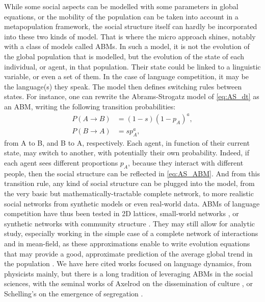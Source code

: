 \documentclass[../thesis.tex]{subfiles}
\begin{document}
While some social aspects can be modelled with some parameters in global equations, or
the mobility of the population can be taken into account in a metapopulation framework,
the social structure itself can hardly be incorporated into these two kinds of model.
That is where the micro approach shines, notably with a class of models called
\acp{ABM}. In such a model, it is not the evolution of the global population that is
modelled, but the evolution of the state of each individual, or agent, in that
population. Their state could be linked to a linguistic variable, or even a set of them.
In the case of language competition, it may be the language(s) they speak. The model
then defines switching rules between states. For instance, one can rewrite the
Abrams-Strogatz model of \cref{eq:AS_dt} as an \ac{ABM}, writing the following
transition probabilities:
\begin{equation}
  \label{eq:AS_ABM}
  \begin{aligned}
    P(A \rightarrow B) &= (1 - s) (1 - p_A)^a, \\
    P(B \rightarrow A) &= s p_A^a,
  \end{aligned}
\end{equation}
from A to B, and B to A, respectively. Each agent, in function of their current state,
may switch to another, with potentially their own probability. Indeed, if each agent
sees different proportions $p_A$, because they interact with different people, then the
social structure can be reflected in \cref{eq:AS_ABM}. And from this transition rule,
any kind of social structure can be plugged into the model, from the very basic but
mathematically-tractable complete network, to more realistic social networks from
synthetic models or even real-world data. \Acp{ABM} of language competition have thus
been tested in 2D lattices, small-world networks \cite{WattsCollectiveDynamics1998}, or
synthetic networks with community structure
\cite{CastelloOrderingDynamics2006,MinettModellingEndangered2008,CaridiSchellingvoterModel2013,CastelloAgentbasedModels2013,VazquezAgentBased2010}. They may still allow for analytic study, especially working in the simple case of a complete network of interactions and in mean-field, as these approximations enable to write evolution equations that may provide a good, approximate prediction of the average global trend in the population \cite{VazquezAgentBased2010}. We have here cited works focused on language dynamics, from physicists mainly, but there is a long tradition of leveraging \acp{ABM} in the social sciences, with the seminal works of Axelrod on the dissemination of culture \cite{AxelrodDisseminationCulture1997}, or Schelling's on the emergence of segregation \cite{SchellingDynamicModels1971}.
\end{document}
